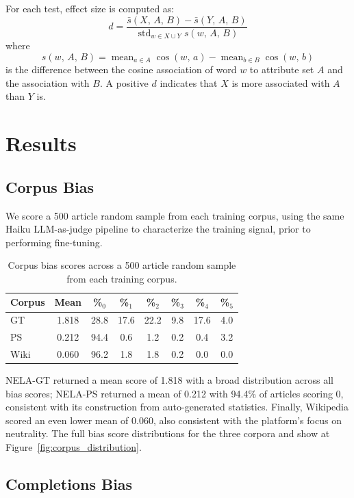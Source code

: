 \documentclass{article}
\begin{document}
For each test, effect size is computed as:
\[
  d = \frac{\bar{s}(X,\,A,\,B) - \bar{s}(Y,\,A,\,B)}
  {\operatorname{std}_{w \in X \cup Y} s(w,\,A,\,B)}
\]
where
\[
  s(w,\,A,\,B) =
  \operatorname{mean}_{a \in A} \cos(w,\,a) -
  \operatorname{mean}_{b \in B} \cos(w,\,b)
\]
is the difference between the cosine association of word $w$ to attribute set $A$ and the association with $B$.
A positive $d$ indicates that $X$ is more associated with $A$ than $Y$ is.

\section{Results}

\subsection{Corpus Bias}

We score a 500 article random sample from each training corpus, using the same Haiku LLM-as-judge pipeline to characterize the training signal, prior to performing fine-tuning. 

\begin{table}[htbp]
  \centering
  \caption{Corpus bias scores across a 500 article random sample from each training corpus.}
  \label{tab:corpus_bias}
  \begin{tabular}{lccccccc}
    \toprule
    Corpus & Mean & \%$_{0}$ & \%$_{1}$ & \%$_{2}$ & \%$_{3}$ & \%$_{4}$ & \%$_{5}$ \\
    \midrule
    GT   & 1.818 & 28.8 & 17.6 & 22.2 &  9.8 & 17.6 & 4.0 \\
    PS   & 0.212 & 94.4 &  0.6 &  1.2 &  0.2 &  0.4 & 3.2 \\
    Wiki & 0.060 & 96.2 &  1.8 &  1.8 &  0.2 &  0.0 & 0.0 \\
    \bottomrule
  \end{tabular}
\end{table}

NELA-GT returned a mean score of 1.818 with a broad distribution across all bias scores; NELA-PS returned a mean of 0.212 with 94.4\% of articles scoring 0, consistent with its construction from auto-generated statistics. Finally, Wikipedia scored an even lower mean of 0.060, also consistent with the platform's focus on neutrality.
The full bias score distributions for the three corpora and show at Figure~\ref{fig:corpus_distribution}.

\subsection{Completions Bias}
\end{document}
